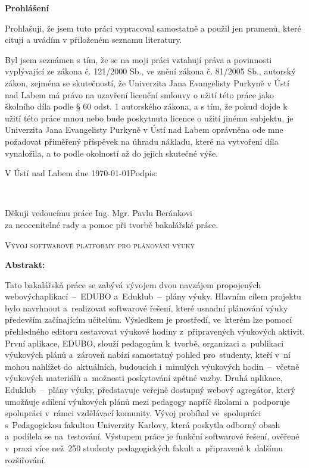 \documentclass[male,czech,api_bc]{kitheses}
\newcommand{\nazevcz}{Vývoj softwarové platformy pro plánování výuky}        %
\newcommand{\vedouciDAT}{Ing. Mgr. Pavlu Beránkovi}
\begin{document}
\thispagestyle{empty} 
{\bfseries Prohlášení}

\vspace{0.5cm}
Prohlašuji, že jsem tuto  práci vypracoval
samostatně a použil
jen pramenů, které cituji a uvádím v přiloženém seznamu literatury.

\vspace{0.5em}

Byl jsem seznámen 
s tím, že se na moji práci vztahují práva a povinnosti vyplývající ze
zákona č. 121/2000 Sb., ve znění zákona č. 81/2005 Sb., autorský zákon, zejména se
skutečností, že Univerzita Jana Evangelisty Purkyně v Ústí nad Labem má právo na uzavření
licenční smlouvy o užití této práce jako školního díla podle § 60 odst. 1 autorského zákona, a
s tím, že pokud dojde k užití této práce mnou nebo bude poskytnuta licence o užití jinému
subjektu, je Univerzita Jana Evangelisty Purkyně v Ústí nad Labem oprávněna ode mne
požadovat přiměřený příspěvek na úhradu nákladu, které na vytvoření díla vynaložila, a to
podle okolností až do jejich skutečné výše.

\vspace{2em}

V Ústí nad Labem dne \today   \hfill Podpis: \makebox[4cm][s]{\dotfill}

\cleardoublepage
\thispagestyle{empty}
~
\vfill

\begin{flushright}
    Děkuji vedoucímu práce {\vedouciDAT}\\ 
    za neocenitelné rady a pomoc při tvorbě bakalářské práce.
\end{flushright}

\cleardoublepage

\textsc{\nazevcz}

\textbf{Abstrakt:}

Tato bakalářská práce se zabývá vývojem dvou navzájem propojených webových\break aplikací~--~EDUBO a~Eduklub~--~plány výuky. Hlavním cílem projektu bylo navrhnout a~realizovat softwarové řešení, které usnadní plánování výuky především začínajícím učitelům. Výsledkem je prostředí, ve~kterém lze pomocí přehledného editoru sestavovat výukové hodiny z~připravených výukových aktivit. První aplikace, EDUBO, slouží pedagogům k~tvorbě, organizaci a~publikaci výukových plánů a~zároveň nabízí samostatný pohled pro~studenty, kteří v~ní mohou nahlížet do~aktuálních, budoucích i~minulých výukových hodin~--~včetně výukových materiálů a~možnosti poskytování zpětné vazby. Druhá aplikace, Eduklub~--~plány výuky, představuje veřejně dostupný webový agregátor, který umožňuje sdílení výukových plánů mezi pedagogy napříč školami a~podporuje spolupráci v~rámci vzdělávací komunity. Vývoj probíhal ve~spolupráci s~Pedagogickou fakultou Univerzity Karlovy, která poskytla odborný obsah a~podílela se na~testování. Výstupem práce je funkční softwarové řešení, ověřené v~praxi více než~250 studenty pedagogických fakult a~připravené k~dalšímu rozšiřování.
\end{document}
